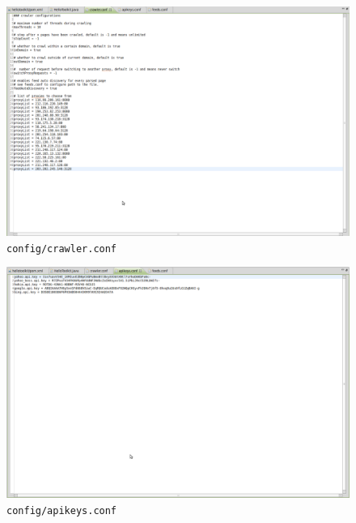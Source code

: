 \begin{figure}
\centering
\includegraphics[trim=0 250px 600px 0,clip=true,width=\textwidth]{img/ht11.png}
\caption{\texttt{config/crawler.conf}}
\label{fig:resource01}
\end{figure}
\begin{figure}
\centering
\includegraphics[trim=0 850px 600px 0,clip=true,width=\textwidth]{img/ht12.png}
\caption{\texttt{config/apikeys.conf}}
\label{fig:resource02}
\end{figure}
